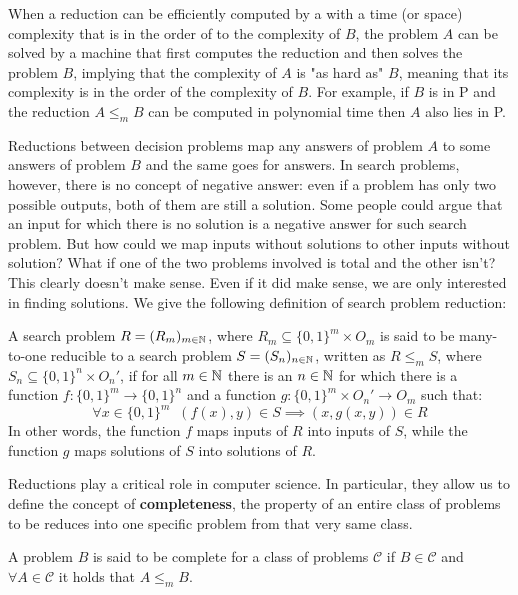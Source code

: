When a reduction can be efficiently computed by a \TM with a time (or space) complexity that is in the order of to the complexity of $B$, the problem $A$ can be solved by a machine that first computes the reduction and then solves the problem $B$, implying that the complexity of $A$ is "as hard as" $B$, meaning that its complexity is in the order of the complexity of $B$. For example, if $B$ is in \textsf{P} and the reduction $A \leq_m B$ can be computed in polynomial time then $A$ also lies in \textsf{P}.

Reductions between decision problems map any  answers of problem $A$ to some  answers of problem $B$ and the same goes for  answers. In search problems, however, there is no concept of negative answer: even if a problem has only two possible outputs, both of them are still a solution. Some people could argue that an input for which there is no solution is a negative answer for such search problem. But how could we map inputs without solutions to other inputs without solution? What if one of the two problems involved is total and the other isn't? This clearly doesn't make sense. Even if it did make sense, we are only interested in finding solutions. We give the following definition of search problem reduction:

\begin{definition}
    A search problem $R = (R_m)_{m \in \mathbb{N}}$, where $R_m \subseteq \{0,1\}^m \times O_m$ is said to be many-to-one reducible to a search problem $S = (S_n)_{n \in \mathbb{N}}$, written as $R \leq_m S$, where $S_n \subseteq \{0,1\}^n \times O_n'$, if for all $m \in \mathbb{N}$ there is an $n \in \mathbb{N}$ for which there is a function $f : \{0,1\}^m \to \{0,1\}^n$ and a function $g : \{0,1\}^m \times O_n' \to O_m$ such that:
    \[\forall x \in \{0,1\}^m \;\; (f(x), y) \in S \implies (x, g(x,y)) \in R\]
    In other words, the function $f$ maps inputs of $R$ into inputs of $S$, while the function $g$ maps solutions of $S$ into solutions of $R$. 
\end{definition}

\newpage

Reductions play a critical role in computer science. In particular, they allow us to define the concept of \textbf{completeness}, the property of an entire class of problems to be reduces into one specific problem from that very same class.

\begin{definition}
    A problem $B$ is said to be complete for a class of problems $\mathcal{C}$ if $B \in \mathcal{C}$ and $\forall A \in \mathcal{C}$ it holds that $A \leq_m B$.
\end{definition}

